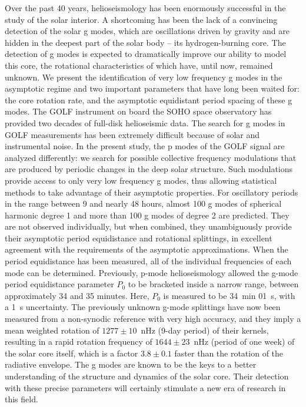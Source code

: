 \documentclass[bibyear]{aa}
\begin{document}
   \date{Received 18 January 2017 / accepted 24 May 2017} 
  \abstract
     {Over the past 40 years, helioseismology has been enormously successful in the study of the solar interior.  A shortcoming has been the lack of a convincing detection of the solar g modes, which  are oscillations driven by gravity and are hidden in the deepest part of the solar body -- its hydrogen-burning core. The detection of g modes is expected to dramatically improve our ability to model this core, the rotational characteristics of which have, until now, remained unknown. }
    {We present the identification of very low frequency g modes in the asymptotic regime and two important parameters that have long been waited for: the core rotation rate, and the asymptotic equidistant period spacing of these g modes. }
   {The GOLF instrument on board the SOHO space observatory has provided two decades of full-disk helioseismic data. The search for g modes in GOLF measurements has been extremely difficult
because of solar and instrumental noise. In the present study, the p modes of the GOLF signal are analyzed differently: we search for possible collective frequency modulations that are produced by periodic changes in the deep solar structure. Such modulations provide access to only very low frequency g modes, thus allowing statistical methods to take advantage of their asymptotic properties.  }
   { For oscillatory periods in the range between 9 and nearly 48 hours, almost 100 g modes of spherical harmonic degree 1 and more than 100 g modes of degree 2 are predicted. They are not observed individually, but when combined, they unambiguously provide their asymptotic period equidistance and rotational splittings, in excellent agreement with the requirements of the asymptotic approximations. When the period equidistance has been measured, all of the individual frequencies of each mode can be determined. Previously, p-mode helioseismology allowed the g-mode period equidistance parameter $P_{0}$ to be bracketed inside a narrow range, between approximately 34 and 35 minutes. Here, $P_{0}$ is measured to be 34~min 01~s, with a 1~s uncertainty. The previously unknown g-mode splittings have now been measured from a non-synodic reference with very high accuracy, and they imply a mean weighted rotation of  $1277  \pm 10$~nHz (9-day period) of their kernels, resulting in a rapid rotation frequency of  $1644\pm 23$~nHz (period of one week) of the solar core itself, which is a factor $3.8 \pm 0.1$ faster than the rotation of the radiative envelope.
}
   {The g modes are known to be the keys to a better understanding of the structure and dynamics of the solar core. Their detection with these precise parameters will certainly stimulate a new era of  research in this field.}
\end{document}
